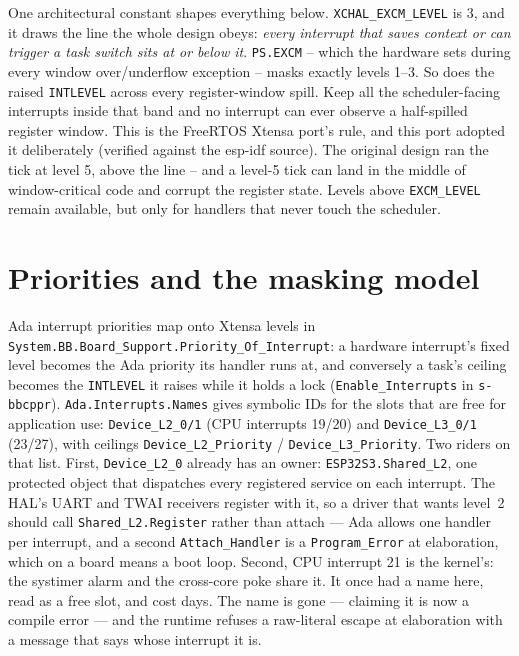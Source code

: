 One architectural constant shapes everything below.
\texttt{XCHAL\_EXCM\_LEVEL} is 3, and it draws the line the whole design obeys:
\emph{every interrupt that saves context or can trigger a task switch sits at
or below it}. \texttt{PS.EXCM} -- which the hardware sets during every window
over/underflow exception -- masks exactly levels 1--3. So does the raised
\texttt{INTLEVEL} across every register-window spill. Keep all the
scheduler-facing interrupts inside that band and no interrupt can ever observe
a half-spilled register window. This is the FreeRTOS Xtensa port's rule, and
this port adopted it deliberately (verified against the esp-idf source). The
original design ran the tick at level 5, above the line -- and a level-5 tick
can land in the middle of window-critical code and corrupt the register state.
Levels above \texttt{EXCM\_LEVEL} remain available, but only for handlers
that never touch the scheduler.

\section{Priorities and the masking model}

Ada interrupt priorities map onto Xtensa levels in
\texttt{System.BB.Board\_Support.Priority\_Of\_Interrupt}: a hardware interrupt's
fixed level becomes the Ada priority its handler runs at, and conversely a task's
ceiling becomes the \texttt{INTLEVEL} it raises while it holds a lock
(\texttt{Enable\_Interrupts} in \texttt{s-bbcppr}). \texttt{Ada.Interrupts.Names}
gives symbolic IDs for the slots that are free for application use:
\texttt{Device\_L2\_0/1} (CPU interrupts 19/20) and \texttt{Device\_L3\_0/1}
(23/27), with ceilings \texttt{Device\_L2\_Priority} /
\texttt{Device\_L3\_Priority}. Two riders on that list. First,
\texttt{Device\_L2\_0} already has an owner: \texttt{ESP32S3.Shared\_L2}, one
protected object that dispatches every registered service on each interrupt.
The HAL's UART and TWAI receivers register with it, so a driver that wants
level~2 should call \texttt{Shared\_L2.Register} rather than attach --- Ada
allows one handler per interrupt, and a second \texttt{Attach\_Handler} is a
\texttt{Program\_Error} at elaboration, which on a board means a boot
loop. Second, CPU interrupt 21 is the kernel's: the systimer
alarm and the cross-core poke share it. It once had a name here, read as a free
slot, and cost days. The name is gone --- claiming it is now a compile error
--- and the runtime refuses a raw-literal escape at elaboration with a message
that says whose interrupt it is.

